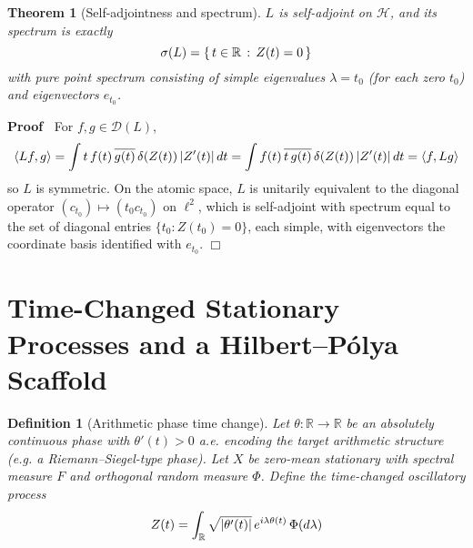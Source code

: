 \documentclass{article}
\newenvironment{proof}{\noindent\textbf{Proof\ }}{\hspace*{\fill}$\Box$\medskip}
\newtheorem{definition}{Definition}
\newtheorem{theorem}{Theorem}
\begin{document}
\begin{theorem}
  [Self-adjointness and spectrum] $L$ is self-adjoint on $\mathcal{H}$, and
  its spectrum is exactly
  \begin{equation}
    \sigma (L) = \{ \hspace{0.17em} t \in \mathbb{R} \hspace{0.17em} :
    \hspace{0.17em} Z (t) = 0 \hspace{0.17em} \}
  \end{equation}
  with pure point spectrum consisting of simple eigenvalues $\lambda = t_0$
  (for each zero $t_0$) and eigenvectors $e_{t_0}$.
\end{theorem}

\begin{proof}
  For $f, g \in \mathcal{D} (L)$,
  \begin{equation}
    \langle Lf, g \rangle = \int t \hspace{0.17em} f (t) \hspace{0.17em}
    \overline{g (t)} \hspace{0.17em} \delta (Z (t)) \hspace{0.17em} |Z' (t) | 
    \hspace{0.17em} dt = \int f (t) \hspace{0.17em} \overline{t
    \hspace{0.17em} g (t)} \hspace{0.17em} \delta (Z (t)) \hspace{0.17em} |Z'
    (t) |  \hspace{0.17em} dt = \langle f, Lg \rangle
  \end{equation}
  so $L$ is symmetric. On the atomic space, $L$ is unitarily equivalent to the
  diagonal operator $(c_{t_0}) \mapsto (t_0 c_{t_0})$ on $\ell^2$, which is
  self-adjoint with spectrum equal to the set of diagonal entries $\{t_0 : Z
  (t_0) = 0\}$, each simple, with eigenvectors the coordinate basis identified
  with $e_{t_0}$.
\end{proof}

\section{Time-Changed Stationary Processes and a Hilbert--P{\'o}lya Scaffold}

\begin{definition}
  [Arithmetic phase time change] Let $\theta : \mathbb{R} \to \mathbb{R}$ be
  an absolutely continuous phase with $\theta' (t) > 0$ a.e. encoding the
  target arithmetic structure (e.g. a Riemann--Siegel-type phase). Let $X$ be
  zero-mean stationary with spectral measure $F$ and orthogonal random measure
  $\Phi$. Define the time-changed oscillatory process
  \begin{equation}
    Z (t) = \int_{\mathbb{R}} \sqrt{| \theta' (t) |}  \hspace{0.17em} e^{i
    \lambda \theta (t)}  \hspace{0.17em} \Phi (d \lambda)
  \end{equation}
\end{definition}
\end{document}
